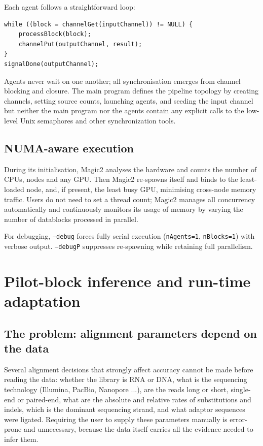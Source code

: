 \documentclass[11pt]{article}
\begin{document}
Each agent follows a straightforward loop:
\begin{lstlisting}
while ((block = channelGet(inputChannel)) != NULL) {
    processBlock(block);
    channelPut(outputChannel, result);
}
signalDone(outputChannel);
\end{lstlisting}

Agents never wait on one another; all synchronisation emerges from
channel blocking and closure.
The main program defines the pipeline topology by creating channels,
setting source counts, launching agents, and seeding the input channel
but neither the main program nor the agents contain any explicit calls to the low-level
Unix semaphores and other synchronization tools.

\subsection{NUMA-aware execution}
\label{sec:numa}

During its initialisation, Magic2 analyses the hardware
and counts the number of CPUs, nodes and any GPU.
Then Magic2 re-spawns itself and
binds to the least-loaded node, and, if present, the least busy GPU,
minimising cross-node memory traffic.
Users do not need to set a thread count; Magic2 manages all concurrency
automatically and continuously monitors its usage of memory
by varying the number of datablocks processed in parallel.

For debugging, \texttt{--debug} forces fully serial execution
(\texttt{nAgents=1}, \texttt{nBlocks=1}) with verbose output.
\texttt{--debugP} suppresses re-spawning while retaining full
parallelism.

\section{Pilot-block inference and run-time adaptation}
\label{sec:pilot}

\subsection{The problem: alignment parameters depend on the data}
\label{sec:pilot_problem}

Several alignment decisions that strongly affect accuracy cannot be
made before reading the data: whether the library is RNA or DNA,
what is the sequencing technology (Illumina, PacBio, Nanopore ...),
are the reads long or short, 
single-end or paired-end, 
what are the absolute and relative rates of substitutions and indels,
which is the dominant sequencing strand, and what adaptor sequences
were ligated.
Requiring the user to supply these parameters manually is error-prone
and unnecessary, because the data itself carries all the evidence
needed to infer them.
\end{document}
